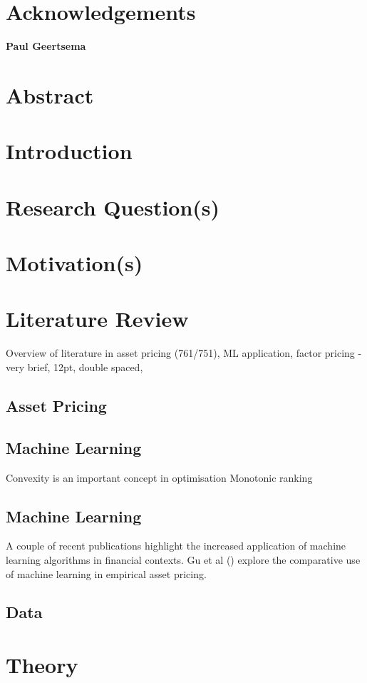 \documentclass[12pt]{article}
\begin{document}
\section{Acknowledgements}
\begin{center}
	\textbf{Paul Geertsema}
\end{center}
\newpage
\section{Abstract}
\newpage
\section{Introduction}
\newpage
\section{Research Question(s)}
\section{Motivation(s)}
\section{Literature Review}\label{LR}
Overview of literature in asset pricing (761/751), ML application, factor pricing - very brief, 12pt, double spaced,
\subsection{Asset Pricing}
\subsection{Machine Learning}
Convexity is an important concept in optimisation
Monotonic ranking
\subsection{Machine Learning}
A couple of recent publications highlight the increased application of machine learning algorithms in financial contexts.
\cite{corporate-culture}
Gu et al (\citeyear{eapvml}) explore the comparative use of machine learning in empirical asset pricing.
\subsection{Data}
\section{Theory}
\end{document}
